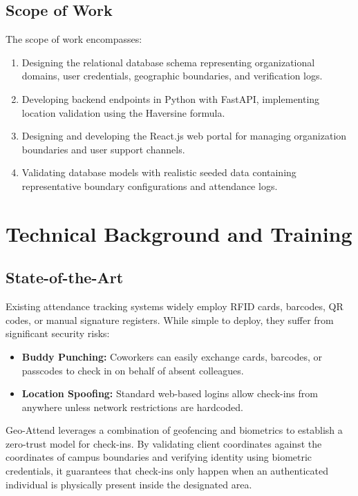 \documentclass[12pt]{report}
\begin{document}
{\section{Scope of Work}
The scope of work encompasses:
\begin{enumerate}
    \item Designing the relational database schema representing organizational domains, user credentials, geographic boundaries, and verification logs.
    \item Developing backend endpoints in Python with FastAPI, implementing location validation using the Haversine formula.
    \item Designing and developing the React.js web portal for managing organization boundaries and user support channels.
    \item Validating database models with realistic seeded data containing representative boundary configurations and attendance logs.
\end{enumerate}


\chapter{Technical Background and Training}

\section{State-of-the-Art}
Existing attendance tracking systems widely employ RFID cards, barcodes, QR codes, or manual signature registers. While simple to deploy, they suffer from significant security risks:
\begin{itemize}
    \item \textbf{Buddy Punching:} Coworkers can easily exchange cards, barcodes, or passcodes to check in on behalf of absent colleagues.
    \item \textbf{Location Spoofing:} Standard web-based logins allow check-ins from anywhere unless network restrictions are hardcoded.
\end{itemize}
Geo-Attend leverages a combination of \gls{geofencing} and \gls{biometrics} to establish a zero-trust model for check-ins. By validating client coordinates against the coordinates of campus boundaries and verifying identity using biometric credentials, it guarantees that check-ins only happen when an authenticated individual is physically present inside the designated area.

}
\end{document}
